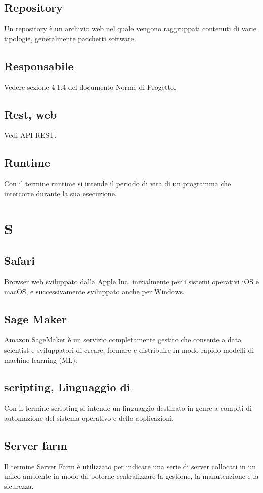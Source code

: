 \subsection{Repository}  Un repository è un archivio web nel quale vengono raggruppati contenuti di varie tipologie, generalmente pacchetti software.
\subsection{Responsabile}  Vedere sezione 4.1.4 del documento Norme di Progetto.
\subsection{Rest, web }  Vedi API REST.
\subsection{Runtime}  Con il termine runtime si intende il periodo di vita di un programma che intercorre durante la sua esecuzione.

\newpage \section{S}
\subsection{Safari}  Browser web sviluppato dalla Apple Inc. inizialmente per i sistemi operativi iOS e macOS, e successivamente sviluppato anche per Windows.
\subsection{Sage Maker}  Amazon SageMaker è un servizio completamente gestito che consente a data scientist e sviluppatori di creare, formare e distribuire in modo rapido modelli di machine learning (ML). 
\subsection{scripting, Linguaggio di}  Con il termine scripting si intende un linguaggio destinato in genre a compiti di automazione del sistema operativo e delle applicazioni.
\subsection{Server farm}  Il termine Server Farm è utilizzato per indicare una serie di server collocati in un unico ambiente in modo da poterne centralizzare la gestione, la manutenzione e la sicurezza.
